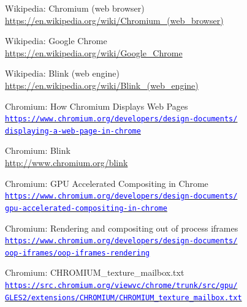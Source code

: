 \documentclass[12pt]{report}
\let\orighref\href
\renewcommand{\href}[2]{%
    \orighref{#1}{\textcolor{blue}{\texttt{#2}}}
}
\let\origurl\url
\renewcommand{\url}[1]{%
    \textcolor{blue}{\origurl{#1}}
}
\begin{document}

\begin{thebibliography}{9}

        Wikipedia: Chromium (web browser) \\
        \url{https://en.wikipedia.org/wiki/Chromium_(web_browser)}

        Wikipedia: Google Chrome \\
        \url{https://en.wikipedia.org/wiki/Google_Chrome}

        Wikipedia: Blink (web engine) \\
        \url{https://en.wikipedia.org/wiki/Blink_(web_engine)}

        Chromium: How Chromium Displays Web Pages \\
        \href{https://www.chromium.org/developers/design-documents/displaying-a-web-page-in-chrome}
        {https://www.chromium.org/developers/design-documents/\\
         displaying-a-web-page-in-chrome}

        Chromium: Blink \\
        \url{http://www.chromium.org/blink}

        Chromium: GPU Accelerated Compositing in Chrome \\
        \href{https://www.chromium.org/developers/design-documents/gpu-accelerated-compositing-in-chrome}
        {https://www.chromium.org/developers/design-documents/\\
        gpu-accelerated-compositing-in-chrome}

        Chromium: Rendering and compositing out of process iframes \\
        \href{https://www.chromium.org/developers/design-documents/oop-iframes/oop-iframes-rendering}
        {https://www.chromium.org/developers/design-documents/\\
        oop-iframes/oop-iframes-rendering}

        Chromium: CHROMIUM\_texture\_mailbox.txt \\
        \href{https://src.chromium.org/viewvc/chrome/trunk/src/gpu/GLES2/extensions/CHROMIUM/CHROMIUM_texture_mailbox.txt}
        {https://src.chromium.org/viewvc/chrome/trunk/src/gpu/\\
        GLES2/extensions/CHROMIUM/CHROMIUM\_texture\_mailbox.txt}


\end{thebibliography}
\end{document}

